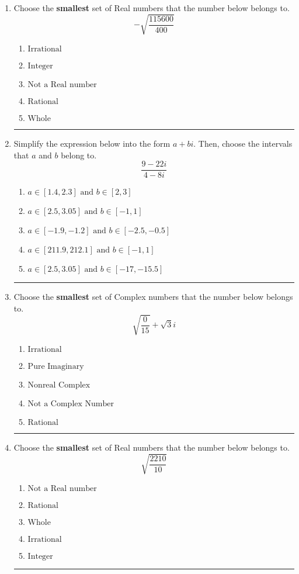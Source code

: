 \documentclass[14pt]{extbook}
\newcommand{\litem}[1]{\item#1\hspace*{-1cm}\rule{\textwidth}{0.4pt}}
\begin{document}
\begin{enumerate}
{\begin{enumerate}[label=\Alph*.]
\end{enumerate} }
\litem{
Choose the \textbf{smallest} set of Real numbers that the number below belongs to.\[ -\sqrt{\frac{115600}{400}} \]\begin{enumerate}[label=\Alph*.]
\item \( \text{Irrational} \)
\item \( \text{Integer} \)
\item \( \text{Not a Real number} \)
\item \( \text{Rational} \)
\item \( \text{Whole} \)

\end{enumerate} }
\litem{
Simplify the expression below into the form $a+bi$. Then, choose the intervals that $a$ and $b$ belong to.\[ \frac{9 - 22 i}{4 - 8 i} \]\begin{enumerate}[label=\Alph*.]
\item \( a \in [1.4, 2.3] \text{ and } b \in [2, 3] \)
\item \( a \in [2.5, 3.05] \text{ and } b \in [-1, 1] \)
\item \( a \in [-1.9, -1.2] \text{ and } b \in [-2.5, -0.5] \)
\item \( a \in [211.9, 212.1] \text{ and } b \in [-1, 1] \)
\item \( a \in [2.5, 3.05] \text{ and } b \in [-17, -15.5] \)

\end{enumerate} }
\litem{
Choose the \textbf{smallest} set of Complex numbers that the number below belongs to.\[ \sqrt{\frac{0}{15}}+\sqrt{3}i \]\begin{enumerate}[label=\Alph*.]
\item \( \text{Irrational} \)
\item \( \text{Pure Imaginary} \)
\item \( \text{Nonreal Complex} \)
\item \( \text{Not a Complex Number} \)
\item \( \text{Rational} \)

\end{enumerate} }
\litem{
Choose the \textbf{smallest} set of Real numbers that the number below belongs to.\[ \sqrt{\frac{2210}{10}} \]\begin{enumerate}[label=\Alph*.]
\item \( \text{Not a Real number} \)
\item \( \text{Rational} \)
\item \( \text{Whole} \)
\item \( \text{Irrational} \)
\item \( \text{Integer} \)


\end{enumerate}}
\end{enumerate}
\end{document}
